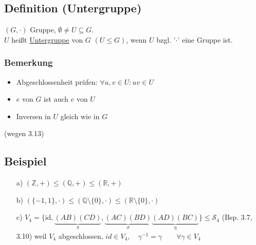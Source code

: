 \documentclass[12pt,titlepage, pdf]{article}
\newcommand{\R}{\mathds{R}}
\newcommand{\uline}[1]{\underline{#1}}
\newcommand{\id}{\textrm{id}}
\renewcommand{\>}{\rightarrow}
\renewcommand{\*}{\cdot}
\begin{document}
\subsection{Definition (Untergruppe)}
$(G, \cdot)$ Gruppe, $\emptyset \neq U \subseteq G$.\\
 $U$ heißt \uline{Untergruppe} von $G$ $(U \leq G)$, wenn $U$ bzgl. '$\cdot$' eine Gruppe ist.
 
 \subsubsection*{Bemerkung}
 \begin{itemize}
 	\item Abgeschlossenheit prüfen: $\forall u,v  \in U: uv \in U$
 	\item $e$ von $G$ ist auch $e$ von $U$
 	\item Inversen in $U$ gleich wie in $G$
 \end{itemize}
(wegen 3.13)
\subsection{Beispiel}
\begin{itemize}
	\item[a)] $(\mathds{Z}, +) \leq (\mathds{Q}, + ) \leq (\R, + )$
	\item[b)] $(\{-1,1\}, \cdot) \leq (\mathds{Q}\setminus \{0\}, \cdot) \leq (\R \setminus\{0\}, \cdot)$
	\item[c)] $V_4 = \{\id,\underbrace{(AB)(CD)}_{\pi},\underbrace{(AC)(BD)}_{\sigma} \underbrace{(AD)(BC)}_{\eta}\} \leq \mathscr{S}_4$ (Bsp. 3.7, 3.10) weil $V_4$ abgeschlossen, $id \in V_4,\quad \gamma^{-1} = \gamma \qquad \forall \gamma \in V_4$
\end{itemize}
\end{document}
